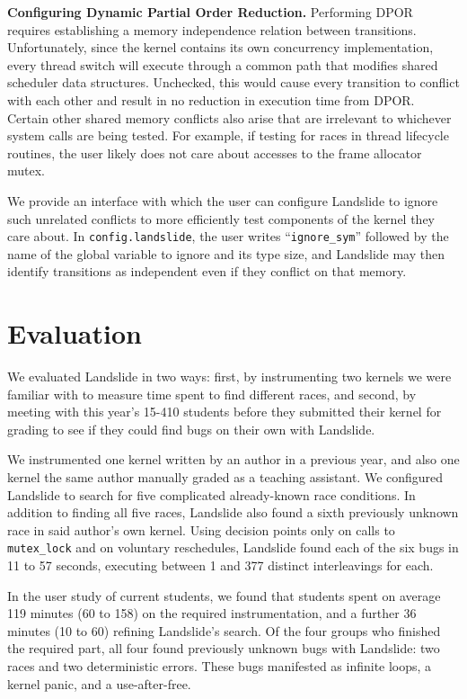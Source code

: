 \documentclass{llncs}
\begin{document}
{\bf Configuring Dynamic Partial Order Reduction.} Performing DPOR \cite{dpor} requires establishing a memory independence relation between transitions.
Unfortunately, since the kernel contains its own concurrency implementation, every thread switch will execute through a common path that modifies shared scheduler data structures.
Unchecked, this would cause every transition to conflict with each other and result in no reduction in execution time from DPOR.
Certain other shared memory conflicts also arise that are irrelevant to whichever system calls are being tested. For example, if testing for races in thread lifecycle routines, the user likely does not care about accesses to the frame allocator mutex.

We provide an interface with which the user can configure Landslide to ignore such unrelated conflicts to more efficiently test components of the kernel they care about. In \texttt{config.landslide}, the user writes ``\texttt{ignore\_sym}'' followed by the name of the global variable to ignore and its type size, and Landslide may then identify transitions as independent even if they conflict on that memory.

\section{Evaluation}

We evaluated Landslide in two ways: first, by instrumenting two kernels we were familiar with to measure time spent to find different races, and second, by meeting with this year's 15-410 students before they submitted their kernel for grading to see if they could find bugs on their own with Landslide.

We instrumented one kernel written by an author in a previous year, and also one kernel the same author manually graded as a teaching assistant. We configured Landslide to search for five complicated already-known race conditions. In addition to finding all five races, Landslide also found a sixth previously unknown race in said author's own kernel. Using decision points only on calls to \texttt{mutex\_lock} and on voluntary reschedules, Landslide found each of the six bugs in 11 to 57 seconds, executing between 1 and 377 distinct interleavings for each.

In the user study of current students, we found that students spent on average 119 minutes (60 to 158) on the required instrumentation, and a further 36 minutes (10 to 60) refining Landslide's search. Of the four groups who finished the required part, all four found previously unknown bugs with Landslide: two races and two deterministic errors. These bugs manifested as infinite loops, a kernel panic, and a use-after-free.
\end{document}
